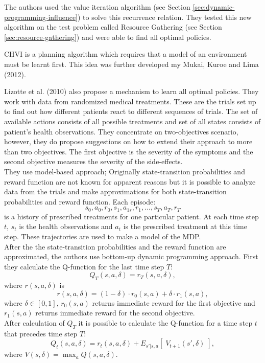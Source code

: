 The authors used the value iteration algorithm (see Section \ref{sec:dynamic-programming-influence}) to solve this recurrence relation. They tested this new algorithm on the test problem called Resource Gathering (see Section \ref{sec:resource-gathering}) and were able to find all optimal policies. 

CHVI is a planning algorithm which requires that a model of an environment must be learnt first. This idea was further developed my Mukai, Kuroe and Lima (2012)\nocite{Mukai2012}.

Lizotte et al. (2010) \nocite{lizotte2010efficient} also propose a mechanism to learn all optimal policies. They work with data from randomized medical treatments. These are the trials set up to find out how different patients react to different sequences of trials. The set of available actions consists of all possible treatments and set of all states consists of patient's health observations. They concentrate on two-objectives scenario, however, they do propose suggestions on how to extend their approach to more than two objectives. The first objective is the severity of the symptoms and the second objective measures the severity of the side-effects. \\

They use model-based approach; Originally state-transition probabilities and reward function are not known for apparent reasons but it is possible to analyze data from the trials and make approximations for both state-transition probabilities and reward function. Each episode:
$$ s_{0},a_{0},r_{0},s_{1},a_{1s},r_{1}, ... , s_{T},a_{T},r_{T} $$
is a history of prescribed treatments for one particular patient. At each time step $t$, $s_{t}$ is the health observations and $a_{t}$ is the prescribed treatment at this time step. These trajectories are used to make a model of the MDP. \\

After the the state-transition probabilities and the reward function are approximated, the authors use bottom-up dynamic programming approach. First they calculate the Q-function for the last time step $T$:
$$ Q_{T}(s,a,\delta) = r_{T}(s,a,\delta), $$
where $r(s,a,\delta)$ is
$$ r(s,a,\delta) = (1 - \delta) \cdot r_{0}(s,a) + \delta \cdot r_{1}(s,a), $$
where $ \delta \in [0,1] $, $ r_{0}(s,a) $ returns immediate reward for the first objective and $ r_{1}(s,a) $ returns immediate reward for the second objective. \\

After calculation of $ Q_{T} $ it is possible to calculate the Q-function for a time step $ t $ that precedes time step $ T $:
$$ Q_{t}(s,a,\delta) = r_{t}(s,a,\delta) + E_{s'|s,a} \left[\; V_{t+1}(s',\delta)\;\right], $$
where $ V(s,\delta) = \max_a Q(s,a,\delta). $

